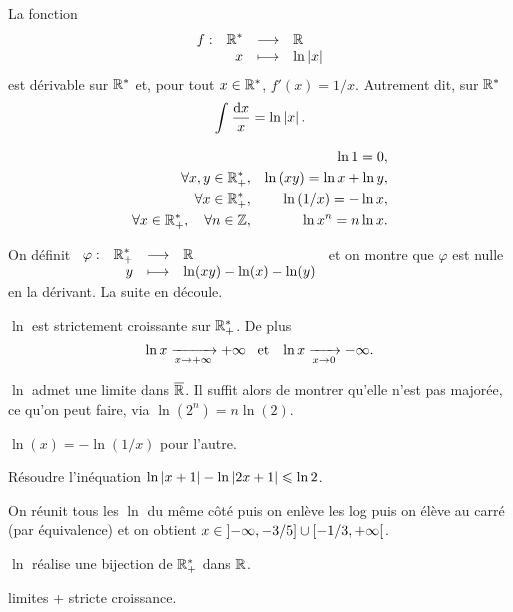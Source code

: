 \documentclass{magnolia}
\begin{document}
\begin{remarqueUnique}
\remarque La fonction
  \[\begin{array}[t]{lrcl} \displaystyle{f} : & \displaystyle{{\mathbb{R}^*}} & \longrightarrow & \displaystyle{\mathbb{R}} \\ & \displaystyle{x} & \longmapsto & \displaystyle{\ln\left|x\right|} \end{array}\]
  est dérivable sur ${\mathbb{R}^*}$ et, pour tout $x\in{\mathbb{R}^*}$, $f'(x)=1/x$. Autrement dit, sur ${\mathbb{R}^*}$
  \[\int_{}^{} \frac{\text{d}x}{x}=\ln\left|x\right|.\]
\end{remarqueUnique}

\begin{proposition}[utile=-3]
\begin{eqnarray*}
                   & & \ln 1=0,\\
\forall x,y\in\mathbb{R}_+^*, & & \ln\left(xy\right)=\ln x+\ln y,\\
\forall x\in\mathbb{R}_+^*, & & \ln\left(1/x\right)=-\ln x,\\
\forall x\in\mathbb{R}_+^* ,\quad \forall n\in\mathbb{Z}, & & \ln x^n=n\ln x.
\end{eqnarray*}
\end{proposition}

\begin{preuve}
On définit $\begin{array}[t]{lrcl} \displaystyle{\varphi} : & \displaystyle{\mathbb{R}_+^*} & \longrightarrow & \displaystyle{\mathbb{R}} \\ & \displaystyle{y} & \longmapsto & \displaystyle{\ln(xy)-\ln(x)-\ln(y)} \end{array}$ et on montre que $\varphi$ est nulle en la dérivant.
La suite en découle.
\end{preuve}


\begin{proposition}[utile=-3]
$\ln$ est strictement croissante sur $\mathbb{R}_+^*$. De plus
\[\ln x \xrightarrow[x\rightarrow +\infty]{} +\infty \quad\!\text{et}\quad\!
  \ln x \xrightarrow[x\rightarrow 0]{} -\infty.\]
\end{proposition}

\begin{preuve}
$\ln$ admet une limite dans $\overline{\mathbb{R}}$. Il suffit alors de montrer qu'elle n'est pas majorée, ce qu'on peut faire, via $\ln(2^n)=n\ln(2)$.

$\ln(x)=-\ln(1/x)$ pour l'autre.
\end{preuve}
\begin{exoUnique}
\exemple Résoudre l'inéquation $\ln\left|x+1\right|-\ln\left|2x+1\right|\leqslant\ln 2$.
  \begin{sol}
On réunit tous les $\ln$ du même côté puis on enlève les log puis on élève au carré (par équivalence) et on obtient $x\in\left]-\infty,-3/5\right]\cup\left[-1/3,+\infty\right[$. 
  \end{sol}
\end{exoUnique}

\begin{proposition}[utile=-3]
$\ln$ réalise une bijection de $\mathbb{R}_+^*$ dans $\mathbb{R}$.
\end{proposition}

\begin{preuve}
limites + stricte croissance.
\end{preuve}
\end{document}
